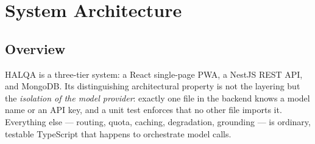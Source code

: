 \chapter{System Architecture}
\label{ch:arch}

\section{Overview}

HALQA is a three-tier system: a React single-page PWA, a NestJS REST API, and MongoDB.
Its distinguishing architectural property is not the layering but the \emph{isolation of
the model provider}: exactly one file in the backend knows a model name or an API key,
and a unit test enforces that no other file imports it. Everything else --- routing,
quota, caching, degradation, grounding --- is ordinary, testable TypeScript that happens
to orchestrate model calls.

